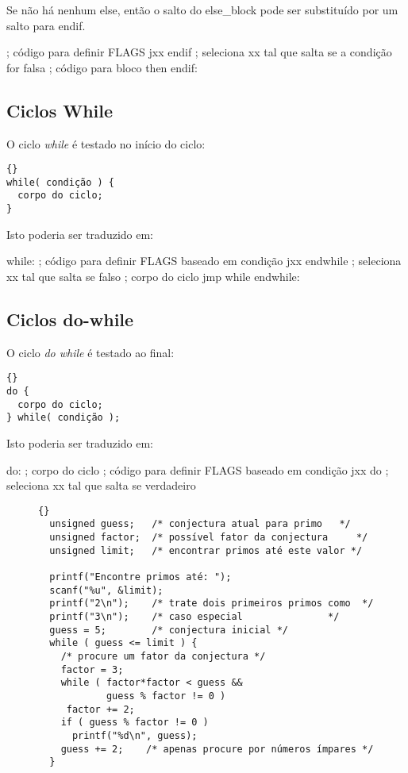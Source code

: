 Se não há nenhum else, então o salto do {\code else\_block} pode ser substituído por
um salto para {\code endif}.
\begin{AsmCodeListing}[frame=none]
      ; código para definir FLAGS
      jxx    endif          ; seleciona xx tal que salta se a condição for falsa
      ; código para bloco then
endif:
\end{AsmCodeListing}

\subsection{Ciclos While }
O ciclo \emph{while} é testado no início do ciclo:
\begin{lstlisting}[stepnumber=0]{}
while( condição ) {
  corpo do ciclo;
}
\end{lstlisting}
\noindent Isto poderia ser traduzido em:
\begin{AsmCodeListing}[frame=none]
while:
      ; código para definir FLAGS baseado em condição
      jxx    endwhile       ; seleciona xx tal que salta se falso
      ; corpo do ciclo
      jmp    while
endwhile:
\end{AsmCodeListing}

\subsection{Ciclos do-while }
O ciclo \emph{do while} é testado ao final:
\begin{lstlisting}[stepnumber=0]{}
do {
  corpo do ciclo;
} while( condição );
\end{lstlisting}
\noindent Isto poderia ser traduzido em:
\begin{AsmCodeListing}[frame=none]
do:
      ; corpo do ciclo
      ; código para definir FLAGS baseado em condição
      jxx    do          ; seleciona xx tal que salta se verdadeiro
      \end{AsmCodeListing}


\begin{figure}[t]
\begin{lstlisting}[frame=tlrb]{}
  unsigned guess;   /* conjectura atual para primo   */
  unsigned factor;  /* possível fator da conjectura     */
  unsigned limit;   /* encontrar primos até este valor */

  printf("Encontre primos até: ");
  scanf("%u", &limit);
  printf("2\n");    /* trate dois primeiros primos como  */
  printf("3\n");    /* caso especial               */
  guess = 5;        /* conjectura inicial */
  while ( guess <= limit ) {
    /* procure um fator da conjectura */
    factor = 3;
    while ( factor*factor < guess &&
            guess % factor != 0 )
     factor += 2;
    if ( guess % factor != 0 )
      printf("%d\n", guess);
    guess += 2;    /* apenas procure por números ímpares */
  }
\end{lstlisting}
\caption{}\label{fig:primec}
\end{figure}

